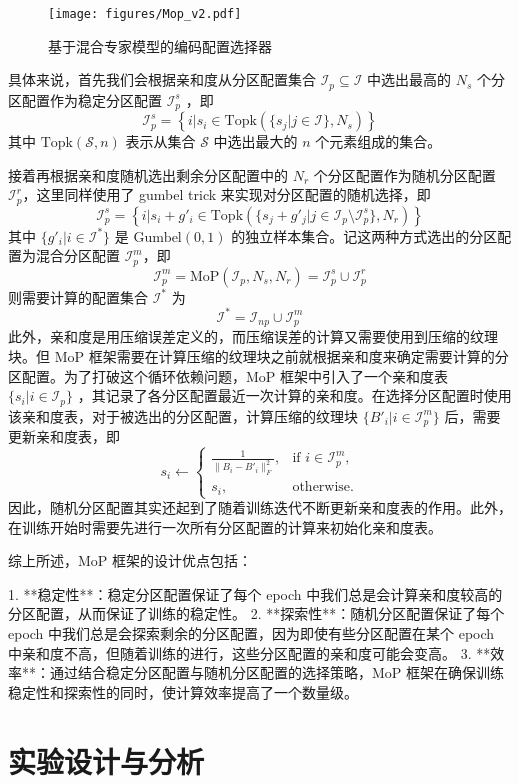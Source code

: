 \begin{figure}[htbp]
    \centering
    \texttt{[image: figures/Mop\_v2.pdf]}
    \caption{基于混合专家模型的编码配置选择器}
    \label{fig:Mop}
\end{figure}

具体来说，首先我们会根据亲和度从分区配置集合 $\mathcal{I}_p\subseteq \mathcal{I}$ 中选出最高的 $N_s$ 个分区配置作为稳定分区配置 $\mathcal{I}_p^s$ ，即
$$
\mathcal{I}_p^s=\left\{i|s_i\in\text{Topk}(\{s_j|j\in\mathcal{I}\},N_s)\right\}
$$
其中 $\text{Topk}(\mathcal{S},n)$ 表示从集合 $\mathcal{S}$ 中选出最大的 $n$ 个元素组成的集合。

接着再根据亲和度随机选出剩余分区配置中的 $N_r$ 个分区配置作为随机分区配置 $\mathcal{I}_{p}^r$，这里同样使用了 gumbel trick 来实现对分区配置的随机选择，即
$$
\mathcal{I}_p^s=\left\{i|s_i+g'_i\in\text{Topk}(\{s_j+g'_j|j\in\mathcal{I}_p\setminus\mathcal{I}_p^s\},N_r)\right\}
$$
其中 $\{g'_i|i\in\mathcal{I}^*\}$ 是 $\text{Gumbel}(0,1)$ 的独立样本集合。记这两种方式选出的分区配置为混合分区配置 $\mathcal{I}_p^m$，即
$$
\mathcal{I}_p^m=\text{MoP}(\mathcal{I}_p,N_s,N_r)=\mathcal{I}_p^s\cup\mathcal{I}_p^r
$$
则需要计算的配置集合 $\mathcal{I}^*$ 为
$$
\mathcal{I}^*=\mathcal{I}_{np}\cup\mathcal{I}_p^m
$$
此外，亲和度是用压缩误差定义的，而压缩误差的计算又需要使用到压缩的纹理块。但 MoP 框架需要在计算压缩的纹理块之前就根据亲和度来确定需要计算的分区配置。为了打破这个循环依赖问题，MoP 框架中引入了一个亲和度表 $\{s_i|i\in\mathcal{I}_p\}$ ，其记录了各分区配置最近一次计算的亲和度。在选择分区配置时使用该亲和度表，对于被选出的分区配置，计算压缩的纹理块 $\{B'_i|i\in\mathcal{I}_p^m\}$ 后，需要更新亲和度表，即
$$
s_i\leftarrow
\begin{cases} 
\frac{1}{\|B_i-B'_i\|_F^2}, & \text{if } i\in\mathcal{I}_p^m,\\
s_i, & \text{otherwise}.
\end{cases}
$$
因此，随机分区配置其实还起到了随着训练迭代不断更新亲和度表的作用。此外，在训练开始时需要先进行一次所有分区配置的计算来初始化亲和度表。

综上所述，MoP 框架的设计优点包括：

1. **稳定性**：稳定分区配置保证了每个 epoch 中我们总是会计算亲和度较高的分区配置，从而保证了训练的稳定性。
2. **探索性**：随机分区配置保证了每个 epoch 中我们总是会探索剩余的分区配置，因为即使有些分区配置在某个 epoch 中亲和度不高，但随着训练的进行，这些分区配置的亲和度可能会变高。
3. **效率**：通过结合稳定分区配置与随机分区配置的选择策略，MoP 框架在确保训练稳定性和探索性的同时，使计算效率提高了一个数量级。

\section{实验设计与分析}


